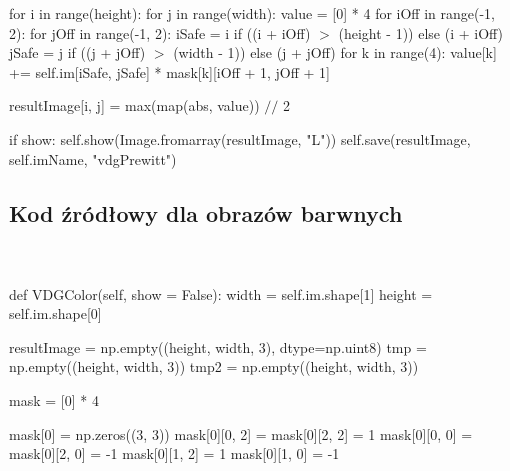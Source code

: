\documentclass[final,a4paper,openany,12pt]{mwbk}
\begin{document}
\indent \indent \indent for i in range(height): \newline
\indent \indent \indent for j in range(width): \newline
\indent \indent \indent value = [0] * 4 \newline
\indent \indent \indent for iOff in range(-1, 2): \newline
\indent \indent \indent for jOff in range(-1, 2): \newline
\indent \indent \indent iSafe = i if ((i + iOff) $>$ (height - 1)) else (i + iOff) \newline
\indent \indent \indent jSafe = j if ((j + jOff) $>$ (width - 1)) else (j + jOff) \newline
\indent \indent \indent for k in range(4): \newline
\indent \indent \indent value[k] += self.im[iSafe, jSafe] * mask[k][iOff + 1, jOff + 1] \newline

\indent \indent \indent resultImage[i, j] = max(map(abs, value)) $//$ 2 \newline

\indent \indent \indent if show: \newline
\indent \indent \indent self.show(Image.fromarray(resultImage, "L")) \newline
\indent \indent \indent self.save(resultImage, self.imName, "vdgPrewitt") \newline

\newpage
\subsection*{Kod źródłowy dla obrazów barwnych}
\hfill
\\\\
\noindent def VDGColor(self, show = False): \newline
\indent width = self.im.shape[1] \newline
\indent height = self.im.shape[0] \newline

resultImage = np.empty((height, width, 3), dtype=np.uint8) \newline
\indent tmp = np.empty((height, width, 3)) \newline
\indent tmp2 = np.empty((height, width, 3)) \newline

mask = [0] * 4 \newline

mask[0] = np.zeros((3, 3)) \newline
\indent mask[0][0, 2] = mask[0][2, 2] = 1 \newline
\indent mask[0][0, 0] = mask[0][2, 0] = -1 \newline
\indent mask[0][1, 2] = 1 \newline
\indent mask[0][1, 0] = -1 \newline
\end{document}
